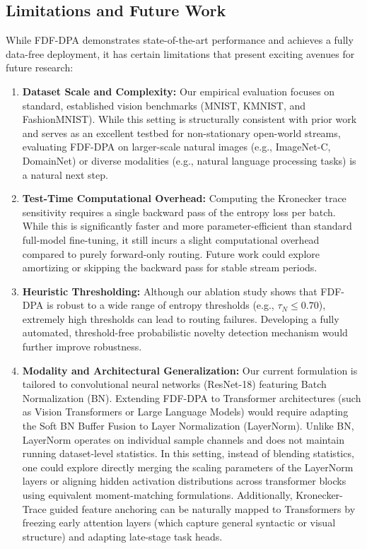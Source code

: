 \documentclass{article}
\theoremstyle{plain}
\theoremstyle{definition}
\theoremstyle{remark}
\begin{document}
\subsection{Limitations and Future Work}
While FDF-DPA demonstrates state-of-the-art performance and achieves a fully data-free deployment, it has certain limitations that present exciting avenues for future research:
\begin{enumerate}
    \item \textbf{Dataset Scale and Complexity:} Our empirical evaluation focuses on standard, established vision benchmarks (MNIST, KMNIST, and FashionMNIST). While this setting is structurally consistent with prior work and serves as an excellent testbed for non-stationary open-world streams, evaluating FDF-DPA on larger-scale natural images (e.g., ImageNet-C, DomainNet) or diverse modalities (e.g., natural language processing tasks) is a natural next step.
    \item \textbf{Test-Time Computational Overhead:} Computing the Kronecker trace sensitivity requires a single backward pass of the entropy loss per batch. While this is significantly faster and more parameter-efficient than standard full-model fine-tuning, it still incurs a slight computational overhead compared to purely forward-only routing. Future work could explore amortizing or skipping the backward pass for stable stream periods.
    \item \textbf{Heuristic Thresholding:} Although our ablation study shows that FDF-DPA is robust to a wide range of entropy thresholds (e.g., $\tau_N \le 0.70$), extremely high thresholds can lead to routing failures. Developing a fully automated, threshold-free probabilistic novelty detection mechanism would further improve robustness.
    \item \textbf{Modality and Architectural Generalization:} Our current formulation is tailored to convolutional neural networks (ResNet-18) featuring Batch Normalization (BN). Extending FDF-DPA to Transformer architectures (such as Vision Transformers or Large Language Models) would require adapting the Soft BN Buffer Fusion to Layer Normalization (LayerNorm). Unlike BN, LayerNorm operates on individual sample channels and does not maintain running dataset-level statistics. In this setting, instead of blending statistics, one could explore directly merging the scaling parameters of the LayerNorm layers or aligning hidden activation distributions across transformer blocks using equivalent moment-matching formulations. Additionally, Kronecker-Trace guided feature anchoring can be naturally mapped to Transformers by freezing early attention layers (which capture general syntactic or visual structure) and adapting late-stage task heads.
\end{enumerate}
\end{document}
